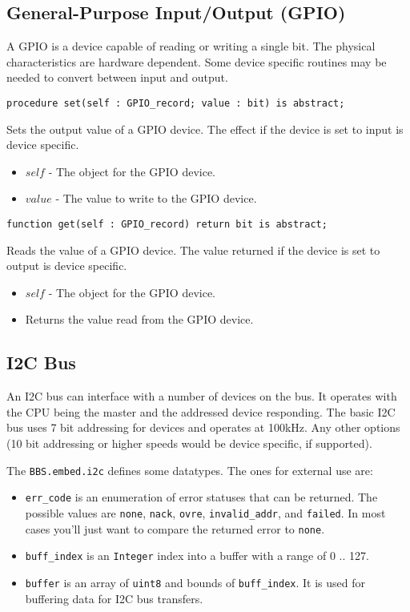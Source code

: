 \documentclass[10pt, openany]{book}
\newcommand{\package}[1]{\texttt{#1}}
\newcommand{\datatype}[1]{\texttt{#1}}
\begin{document}
\subsection{General-Purpose Input/Output (GPIO)}
A GPIO is a device capable of reading or writing a single bit.  The physical characteristics are hardware dependent.  Some device specific routines may be needed to convert between input and output.
\begin{lstlisting}
procedure set(self : GPIO_record; value : bit) is abstract;
\end{lstlisting}
Sets the output value of a GPIO device.  The effect if the device is set to input is device specific.
\begin{itemize}
  \item $self$ - The object for the GPIO device.
  \item $value$ - The value to write to the GPIO device.
\end{itemize}
\begin{lstlisting}
function get(self : GPIO_record) return bit is abstract;
\end{lstlisting}
Reads the value of a GPIO device.  The value returned if the device is set to output is device specific.
\begin{itemize}
  \item $self$ - The object for the GPIO device.
  \item Returns the value read from the GPIO device.
\end{itemize}

\subsection{I2C Bus}
An I2C bus can interface with a number of devices on the bus.  It operates with the CPU being the master and the addressed device responding.  The basic I2C bus uses 7 bit addressing for devices and operates at 100kHz.  Any other options (10 bit addressing or higher speeds would be device specific, if supported).

The \package{BBS.embed.i2c} defines some datatypes.  The ones for external use are:
\begin{itemize}
  \item \datatype{err\_code} is an enumeration of error statuses that can be returned.  The possible values are \datatype{none}, \datatype{nack}, \datatype{ovre}, \datatype{invalid\_addr}, and \datatype{failed}.  In most cases you'll just want to compare the returned error to \datatype{none}.
  \item \datatype{buff\_index} is an \datatype{Integer} index into a buffer with a range of 0 .. 127.
  \item \datatype{buffer} is an array of \datatype{uint8} and bounds of \datatype{buff\_index}.  It is used for buffering data for I2C bus transfers.
\end{itemize}
\end{document}
